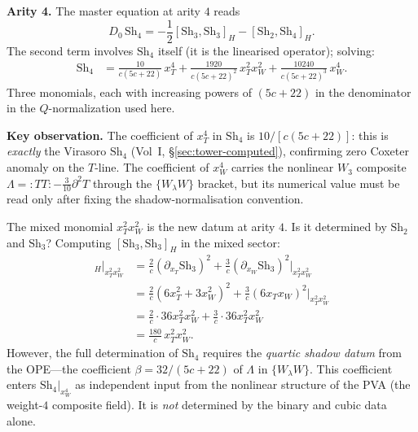 \documentclass[11pt]{article}
\newcommand{\normord}[1]{:\!#1\!:}
\begin{document}
\medskip
\noindent\textbf{Arity 4.}  The master equation at arity $4$
reads
\[
D_0\,\mathrm{Sh}_4
= -\frac{1}{2}[\mathrm{Sh}_3, \mathrm{Sh}_3]_H
  - [\mathrm{Sh}_2, \mathrm{Sh}_4]_H.
\]
The second term involves $\mathrm{Sh}_4$ itself (it is the
linearised operator); solving:
\begin{align*}
\mathrm{Sh}_4
&= \frac{10}{c(5c{+}22)}\,x_T^4
+ \frac{1920}{c(5c{+}22)^2}\,x_T^2 x_W^2
+ \frac{10240}{c(5c{+}22)^3}\,x_W^4.
\end{align*}
Three monomials, each with increasing powers of $(5c{+}22)$ in
the denominator in the $Q$-normalization used here.

\medskip
\noindent\textbf{Key observation.}  The coefficient of $x_T^4$
in $\mathrm{Sh}_4$ is $10/[c(5c{+}22)]$: this is
\emph{exactly} the Virasoro $\mathrm{Sh}_4$ (Vol~I,
\S\ref{sec:tower-computed}), confirming zero Coxeter anomaly on
the $T$-line.  The coefficient of $x_W^4$ carries the nonlinear
$W_3$ composite
$\Lambda = \normord{TT} - \frac{3}{10}\partial^2 T$ through the
$\{W_\lambda W\}$ bracket, but its numerical value must be read
only after fixing the shadow-normalisation convention.

The mixed monomial $x_T^2 x_W^2$ is the new datum at arity $4$.
Is it determined by $\mathrm{Sh}_2$ and $\mathrm{Sh}_3$?
Computing $[\mathrm{Sh}_3, \mathrm{Sh}_3]_H$ in the mixed sector:
\begin{align*}
[\mathrm{Sh}_3, \mathrm{Sh}_3]_H \big|_{x_T^2 x_W^2}
&= \frac{2}{c}(\partial_{x_T}\mathrm{Sh}_3)^2
   + \frac{3}{c}(\partial_{x_W}\mathrm{Sh}_3)^2
   \bigg|_{x_T^2 x_W^2}
\\
&= \frac{2}{c}(6x_T^2 + 3x_W^2)^2
   + \frac{3}{c}(6x_T x_W)^2
   \bigg|_{x_T^2 x_W^2}
\\
&= \frac{2}{c}\cdot 36 x_T^2 x_W^2
   + \frac{3}{c}\cdot 36 x_T^2 x_W^2
\\
&= \frac{180}{c}\,x_T^2 x_W^2.
\end{align*}
However, the full determination of $\mathrm{Sh}_4$ requires the
\emph{quartic shadow datum} from the OPE---the coefficient
$\beta = 32/(5c+22)$ of $\Lambda$ in $\{W_\lambda W\}$.  This
coefficient enters $\mathrm{Sh}_4|_{x_W^4}$ as independent input
from the nonlinear structure of the PVA (the weight-$4$
composite field).  It is \emph{not} determined by the binary
and cubic data alone.
\end{document}
